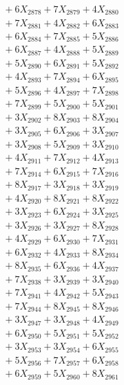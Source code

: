 \documentclass[a4paper,10pt]{article}
\begin{document}
{\begin{align}
&\;  + 6 X_{2878} + 7 X_{2879} + 4 X_{2880} \\[0.3ex]
&\;  + 7 X_{2881} + 4 X_{2882} + 6 X_{2883} \\[0.3ex]
&\;  + 6 X_{2884} + 7 X_{2885} + 5 X_{2886} \\[0.3ex]
&\;  + 6 X_{2887} + 4 X_{2888} + 5 X_{2889} \\[0.5ex]\allowbreak
&\;  + 5 X_{2890} + 6 X_{2891} + 5 X_{2892} \\[0.3ex]
&\;  + 4 X_{2893} + 7 X_{2894} + 6 X_{2895} \\[0.3ex]
&\;  + 5 X_{2896} + 4 X_{2897} + 7 X_{2898} \\[0.3ex]
&\;  + 7 X_{2899} + 5 X_{2900} + 5 X_{2901} \\[0.3ex]
&\;  + 3 X_{2902} + 8 X_{2903} + 8 X_{2904} \\[0.3ex]
&\;  + 3 X_{2905} + 6 X_{2906} + 3 X_{2907} \\[0.3ex]
&\;  + 3 X_{2908} + 5 X_{2909} + 3 X_{2910} \\[0.3ex]
&\;  + 4 X_{2911} + 7 X_{2912} + 4 X_{2913} \\[0.3ex]
&\;  + 7 X_{2914} + 6 X_{2915} + 7 X_{2916} \\[0.3ex]
&\;  + 8 X_{2917} + 3 X_{2918} + 3 X_{2919} \\[0.5ex]\allowbreak
&\;  + 4 X_{2920} + 8 X_{2921} + 8 X_{2922} \\[0.3ex]
&\;  + 3 X_{2923} + 6 X_{2924} + 3 X_{2925} \\[0.3ex]
&\;  + 3 X_{2926} + 3 X_{2927} + 8 X_{2928} \\[0.3ex]
&\;  + 4 X_{2929} + 6 X_{2930} + 7 X_{2931} \\[0.3ex]
&\;  + 6 X_{2932} + 4 X_{2933} + 8 X_{2934} \\[0.3ex]
&\;  + 8 X_{2935} + 6 X_{2936} + 4 X_{2937} \\[0.3ex]
&\;  + 7 X_{2938} + 3 X_{2939} + 3 X_{2940} \\[0.3ex]
&\;  + 7 X_{2941} + 4 X_{2942} + 5 X_{2943} \\[0.3ex]
&\;  + 7 X_{2944} + 8 X_{2945} + 8 X_{2946} \\[0.3ex]
&\;  + 3 X_{2947} + 3 X_{2948} + 4 X_{2949} \\[0.5ex]\allowbreak
&\;  + 6 X_{2950} + 5 X_{2951} + 5 X_{2952} \\[0.3ex]
&\;  + 3 X_{2953} + 3 X_{2954} + 6 X_{2955} \\[0.3ex]
&\;  + 5 X_{2956} + 7 X_{2957} + 6 X_{2958} \\[0.3ex]
&\;  + 6 X_{2959} + 5 X_{2960} + 8 X_{2961} \\[0.3ex]

\end{align}}
\end{document}
